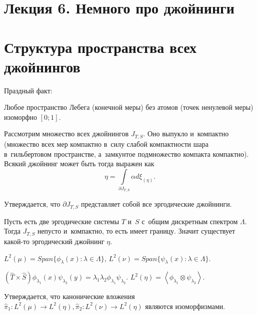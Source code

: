 \documentclass{article}
\begin{document}
\section*{Лекция 6. Немного про джойнинги}
\resetcntrs

\section{Структура пространства всех джойнингов}

Праздный факт:
\begin{theorem}[Рохлин]
	Любое пространство Лебега (конечной меры) без атомов (точек ненулевой меры)
	изоморфно $[0; 1]$.
\end{theorem}

Рассмотрим множество всех джойнингов $J_{T,S}$. Оно выпукло и~компактно
(множество всех мер компактно в~силу слабой компактности шара в~гильбертовом
пространстве, а~замкунтое подмножество компакта компактно). Всякий джойнинг
может быть тогда выражен как
$$ \eta = \int\limits_{\partial J_{T,S}} \alpha d\xi_{(\eta)}. $$

Утверждается, что $\partial J_{T,S}$ представляет собой все эргодические
джойнинги.

Пусть есть две эргодические системы $T$ и~$S$ с~общим дискретным спектром
$\Lambda$. Тогда $J_{T,S}$ непусто и~компактно, то есть имеет границу. Значит
существует какой-то эргодический джойнинг $\eta$.

$L^2(\mu) = Span\{ \phi_\lambda(x): \lambda \in \Lambda \}$,
$L^2(\nu) = Span\{ \psi_\lambda(x): \lambda \in \Lambda \}$.

$(\hat T \times \hat S) \phi_{\lambda_1}(x) \psi_{\lambda_2}(y) = \lambda_1
\lambda_2 \phi_{\lambda_1} \psi_{\lambda_2}$. $L^2(\eta) = \left<
\phi_{\lambda_1} \otimes \psi_{\lambda_2} \right>$.

Утверждается, что канонические вложения $\hat \pi_1: L^2(\mu) \rightarrow
L^2(\eta), \hat \pi_2: L^2(\nu) \rightarrow L^2(\eta)$ являются изоморфизмами.
\end{document}
